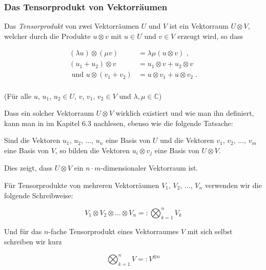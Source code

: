 \subsubsection{Das Tensorprodukt von Vektorräumen}

Das \textit{Tensorprodukt} von zwei Vektorräumen $U$ und $V$ ist ein Vektorraum $U\!\otimes\! V$, welcher durch die Produkte $u\otimes v$ mit $u\in U$ und $v\in V$ erzeugt wird, so dass 

\vspace{-0.5cm}
\[\begin{split} 
(\lambda u)\otimes (\mu v) &=\lambda \mu (u\otimes v)\text{ , }  \\[0.2cm]
(u_1+u_2)\otimes v &= u_1\otimes v + u_2\otimes v \\[0.2cm]
\text{ und }  u\otimes (v_1+v_2)&=u\otimes v_1 + u\otimes v_2 \; .\\
\end{split}\]

\vspace{-0.2cm}
\noindent (Für alle $u$, $u_1$, $u_2\in U$, $v$, $v_1$, $v_2\in V$ und $\lambda, \mu \in \mathbb{C}$)

\vspace{0.2cm}
\noindent Dass ein solcher Vektorraum $U\otimes V$ wirklich existiert und wie man ihn definiert, kann man in \cite{LA} im Kapitel 6.3 nachlesen, ebenso wie die folgende Tatsache:

\vspace{0.2cm}
\noindent Sind die Vektoren $u_1$, $u_2$, $\ldots$, $u_n$ eine Basis von $U$ und die Vektoren $v_1$, $v_2$, $\ldots$, $v_m$ eine Basis von $V$, so bilden die Vektoren $u_i \otimes v_j$ eine Basis von $U\otimes V$. 
\vspace{0.1cm}

\noindent Dies zeigt, dass $U\otimes V$ ein $n\cdot m$-dimensionaler Vektorraum ist.

\vspace{0.3cm}
\noindent Für Tensorprodukte von mehreren Vektorräumen $V_1$, $V_2$, $\ldots$, $V_n$ verwenden wir die folgende Schreibweise:

\vspace{-0.7cm}
\[V_1\otimes V_2\otimes \ldots \otimes V_n=:\bigotimes_{k=1}^nV_k\]


\noindent Und für das $n$-fache Tensorprodukt eines Vektorraumes $V$ mit sich selbst schreiben wir kurz 

\vspace{-0.3cm}
\[\bigotimes_{k=1}^nV=:V^{\otimes n}\]

